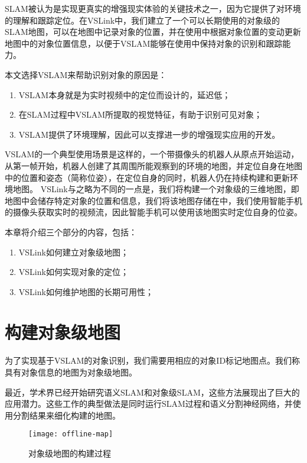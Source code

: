 SLAM被认为是实现更真实的增强现实体验的关键技术之一，因为它提供了对环境的理解和跟踪定位。在VSLink中，我们建立了一个可以长期使用的对象级的SLAM地图，可以在地图中记录对象的位置，并在使用中根据对象位置的变动更新地图中的对象位置信息，以便于VSLAM能够在使用中保持对象的识别和跟踪能力。

本文选择VSLAM来帮助识别对象的原因是：

\begin{enumerate}
	\item VSLAM本身就是为实时视频中的定位而设计的，延迟低；
	\item 在SLAM过程中VSLAM所提取的视觉特征，有助于识别可见对象；
	\item VSLAM提供了环境理解，因此可以支撑进一步的增强现实应用的开发。
\end{enumerate}

VSLAM的一个典型使用场景是这样的，一个带摄像头的机器人从原点开始运动，从第一帧开始，机器人创建了其周围所能观察到的环境的地图，并定位自身在地图中的位置和姿态（简称位姿），在定位自身的同时，机器人仍在持续构建和更新环境地图。
VSLink与之略为不同的一点是，我们将构建一个对象级的三维地图，即地图中会储存特定对象的位置和信息，我们将该地图存储在{\edg}中，我们使用智能手机的摄像头获取实时的视频流，因此智能手机可以使用该地图实时定位自身的位姿。

本章将介绍三个部分的内容，包括：
\begin{enumerate}
	\item VSLink如何建立对象级地图；
	\item VSLink如何实现对象的定位；
	\item VSLink如何维护地图的长期可用性；
\end{enumerate}

\section{构建对象级地图}
\label{sec:map}
为了实现基于VSLAM的对象识别，我们需要用相应的对象ID标记地图点。我们称具有对象信息的地图为对象级地图。

最近，学术界已经开始研究语义SLAM\cite{bowman2017probabilistic,kaneko2018mask}和对象级SLAM\cite{mccormac2018fusion++,strecke2019fusion}，这些方法展现出了巨大的应用潜力。这些工作的典型做法是同时运行SLAM过程和语义分割神经网络，并使用分割结果来细化构建的地图。

\begin{figure}[htbp]
	\centering
	\texttt{[image: offline-map]}
	\caption{对象级地图的构建过程}
	\label{fig:offlinemap}
\end{figure}

